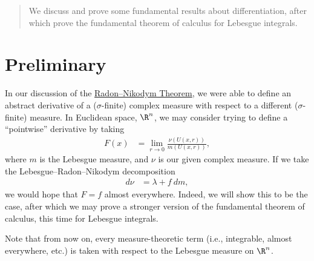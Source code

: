 \documentclass[10pt]{mypackage}
\begin{document}
\RaggedRight
\begin{abstract}
  \noindent We discuss and prove some fundamental results about differentiation, after which prove the fundamental theorem of calculus for Lebesgue integrals.
\end{abstract}
\section{Preliminary}%
In our discussion of the \href{https://ai-bearing.github.io/Classes_and_Homework/After\%20College/Expository\%20Writings/radon_nikodym.pdf}{Radon--Nikodym Theorem}, we were able to define an abstract derivative of a ($\sigma$-finite) complex measure with respect to a different ($\sigma$-finite) measure. In Euclidean space, $\R^n$, we may consider trying to define a ``pointwise'' derivative by taking
\begin{align*}
  F(x) &= \lim_{r\rightarrow 0} \frac{\nu\left( U\left( x,r \right) \right)}{m\left( U\left( x,r \right) \right)},
\end{align*}
where $m$ is the Lebesgue measure, and $\nu$ is our given complex measure. If we take the Lebesgue--Radon--Nikodym decomposition
\begin{align*}
  d\nu &= \lambda + f\:dm,
\end{align*}
we would hope that $F = f$ almost everywhere. Indeed, we will show this to be the case, after which we may prove a stronger version of the fundamental theorem of calculus, this time for Lebesgue integrals.\newline

Note that from now on, every measure-theoretic term (i.e., integrable, almost everywhere, etc.) is taken with respect to the Lebesgue measure on $\R^n$.\newline
\end{document}
